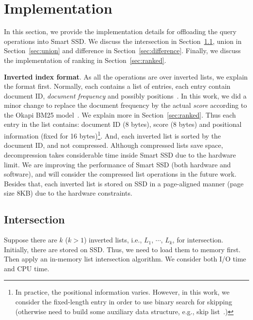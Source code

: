 
\section{Implementation}\label{sec:implementation}
In this section, we provide the implementation details for offloading the query operations into Smart SSD. We discuss the intersection in Section~\ref{sec:intersection}, union in Section~\ref{sec:union} and difference in Section~\ref{sec:difference}. Finally, we discuss the implementation of ranking in Section~\ref{sec:ranked}.

\textbf{Inverted index format}. As all the operations are over inverted lists, we explain the format first.
Normally, each contains a list of entries, each entry contain document ID, \emph{document frequency} and possibly positions~\cite{ZM06,M08}. In this work, we did a minor change to replace the document frequency by the actual \emph{score} according to the Okapi BM25 model~\cite{Robertson1994}. We explain more in Section~\ref{sec:ranked}. Thus each entry in the list contains: document ID (8 bytes), score (8 bytes) and positional information (fixed for 16 bytes)\footnote{In practice, the positional information varies. However, in this work, we consider the fixed-length entry in order to use binary search for skipping (otherwise need to build some auxiliary data structure, e.g., skip list~\cite{Pugh1990}.)}. And, each inverted list is sorted by the document ID, and not compressed. Although compressed lists save space, decompression takes considerable time inside Smart SSD due to the hardware limit. We are improving the performance of Smart SSD (both hardware and software), and will consider the compressed list operations in the future work. Besides that, each inverted list is stored on SSD in a page-aligned manner (page size 8KB) due to the hardware constraints.


\subsection{Intersection}\label{sec:intersection}

Suppose there are $k$ ($k>1$) inverted lists, i.e., $L_1$, $\cdots$, $L_k$, for intersection. Initially, there are stored on SSD. Thus, we need to load them to memory first. Then apply an in-memory list intersection algorithm. We consider both I/O time and CPU time.

